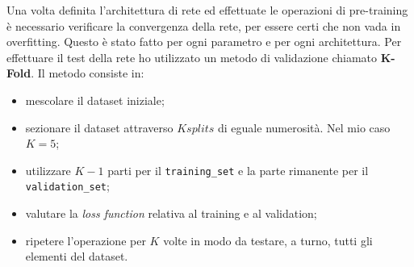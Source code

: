 \documentclass[12pt,a4paper,final]{book}
\begin{document}
Una volta definita l'architettura di rete ed effettuate le operazioni di pre-training è necessario verificare la convergenza della rete, per essere certi che non vada in overfitting. Questo è stato fatto per ogni parametro e per ogni architettura.
Per effettuare il test della rete ho utilizzato un metodo di validazione chiamato \textbf{K-Fold}. Il metodo consiste in:
\begin{itemize}
	\item mescolare il dataset iniziale;
	\item sezionare il dataset attraverso $K splits$ di eguale numerosità. Nel mio caso $K=5$;
	\item utilizzare $K-1$ parti per il \texttt{training\_set} e la parte rimanente per il \texttt{validation\_set};
	\item valutare la \textit{loss function} relativa al training e al validation;
	\item ripetere l'operazione per $K$ volte in modo da testare, a turno, tutti gli elementi del dataset.
\end{itemize}
\end{document}
